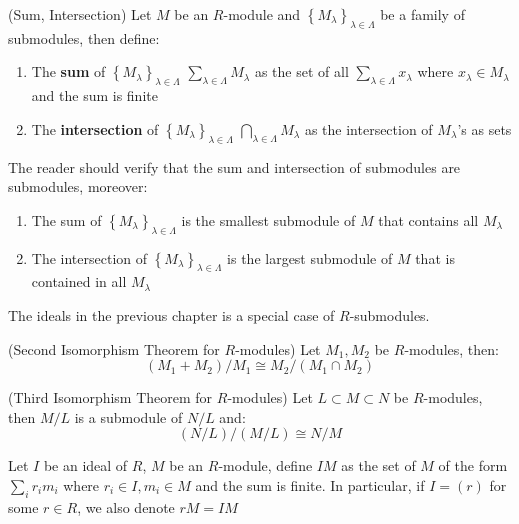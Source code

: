 \documentclass{note-eng}
\begin{document}
\begin{definition}
    (Sum, Intersection) Let $M$ be an $R$-module and $\left\lbrace M_\lambda \right\rbrace_{\lambda \in \Lambda}$ be a family of submodules, then define:
    \begin{enumerate}
        \item The \textbf{sum} of $\left\lbrace M_\lambda \right\rbrace_{\lambda \in \Lambda}$ $\sum\limits_{\lambda \in \Lambda} M_\lambda$ as the set of all $\sum\limits_{\lambda \in \Lambda} x_\lambda$ where $x_\lambda \in M_\lambda$ and the sum is finite
        \item The \textbf{intersection} of $\left\lbrace M_{\lambda} \right\rbrace_{\lambda \in \Lambda}$ $\bigcap\limits_{\lambda \in \Lambda}M_{\lambda}$ as the intersection of $M_\lambda$'s as sets
    \end{enumerate}
    The reader should verify that the sum and intersection of submodules are submodules, moreover:
    \begin{enumerate}
        \item The sum of $\left\lbrace M_\lambda \right\rbrace_{\lambda \in \Lambda}$ is the smallest submodule of $M$ that contains all $M_\lambda$
        \item The intersection of $\left\lbrace M_\lambda \right\rbrace_{\lambda \in \Lambda}$ is the largest submodule of $M$ that is contained in all $M_\lambda$
    \end{enumerate}
\end{definition}

The ideals in the previous chapter is a special case of $R$-submodules.

\begin{theorem}
    (Second Isomorphism Theorem for $R$-modules) Let $M_1, M_2$ be $R$-modules, then:
    $$(M_1 + M_2) / M_1 \cong M_2 / (M_1 \cap M_2)$$
\end{theorem}

\begin{theorem}
    (Third Isomorphism Theorem for $R$-modules) Let $L \subset M \subset N$ be $R$-modules, then $M / L$ is a submodule of $N / L$ and:
    $$(N / L) / (M / L) \cong N / M$$
\end{theorem}

\begin{definition}
    Let $I$ be an ideal of $R$, $M$ be an $R$-module, define $IM$ as the set of $M$ of the form $\sum\limits_{i} r_i m_i$ where $r_i \in I, m_i \in M$ and the sum is finite. In particular, if $I = (r)$ for some $r \in R$, we also denote $rM = IM$
\end{definition}
\end{document}
